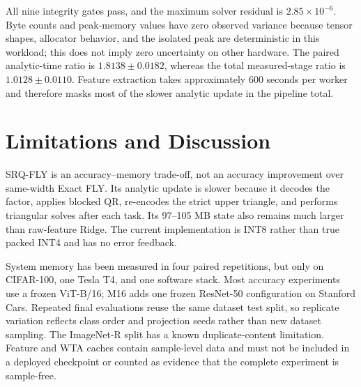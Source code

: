 \documentclass[runningheads]{llncs}
\begin{document}
All nine integrity gates pass, and the maximum solver residual is
$2.85\times10^{-6}$. Byte counts and peak-memory values have zero observed
variance because tensor shapes, allocator behavior, and the isolated peak are
deterministic in this workload; this does not imply zero uncertainty on other
hardware. The paired analytic-time ratio is $1.8138\pm0.0182$, whereas the
total measured-stage ratio is $1.0128\pm0.0110$. Feature extraction takes
approximately 600 seconds per worker and therefore masks most of the slower
analytic update in the pipeline total.

\section{Limitations and Discussion}

SRQ-FLY is an accuracy--memory trade-off, not an accuracy improvement over
same-width Exact FLY. Its analytic update is slower because it decodes the
factor, applies blocked QR, re-encodes the strict upper triangle, and performs
triangular solves after each task. Its 97--105 MB state also remains much
larger than raw-feature Ridge. The current implementation is INT8 rather than
true packed INT4 and has no error feedback.

System memory has been measured in four paired repetitions, but only on
CIFAR-100, one Tesla T4, and one software stack. Most accuracy experiments use
a frozen ViT-B/16; M16 adds one frozen ResNet-50 configuration on Stanford
Cars. Repeated final evaluations reuse
the same dataset test split, so replicate variation reflects class order and
projection seeds rather than new dataset sampling. The ImageNet-R split has a
known duplicate-content limitation. Feature and WTA caches contain
sample-level data and must not be included in a deployed checkpoint or counted
as evidence that the complete experiment is sample-free.
\end{document}
